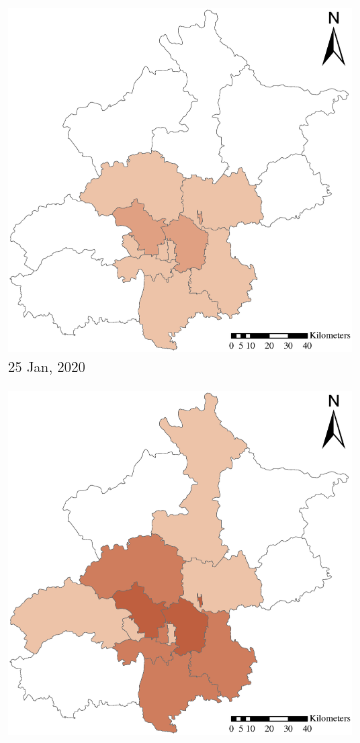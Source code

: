 \documentclass[preprints,article,accept,moreauthors,pdftex]{Definitions/mdpi}
\begin{document}
\begin{figure}[ht]
    \centering
    \begin{subfigure}{.23\textwidth}
        \includegraphics[width=\textwidth]{Figures/ConfirmedDistrictD2020_01_25.eps}
        \caption{25 Jan, 2020}
    \end{subfigure}
    \begin{subfigure}{.23\textwidth}
        \includegraphics[width=\textwidth]{Figures/ConfirmedDistrictD2020_01_30.eps}

\end{subfigure}
\end{figure}
\end{document}
